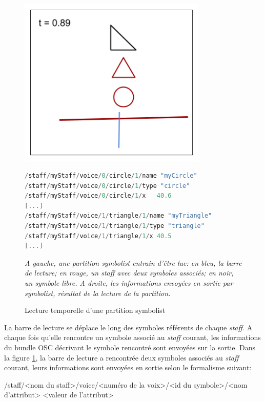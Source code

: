 \begin{figure}[H]

\centering
\begin{minipage}{0.45\textwidth}
	\includegraphics[keepaspectratio=true, width=0.8\textwidth]{ModeleDeNotation/i/readingTheScore.png}
\end{minipage}%
\begin{minipage}{0.45\textwidth}
\begin{lstlisting}[language = {C++}, numbers=none]
/staff/myStaff/voice/0/circle/1/name "myCircle"
/staff/myStaff/voice/0/circle/1/type "circle"
/staff/myStaff/voice/0/circle/1/x	40.6
[...]
/staff/myStaff/voice/1/triangle/1/name "myTriangle"
/staff/myStaff/voice/1/triangle/1/type "triangle"
/staff/myStaff/voice/1/triangle/1/x	40.5 
[...]
\end{lstlisting}
\end{minipage}%

\caption{Lecture temporelle d'une partition symbolist}
\label{fig:readingTheScore}
\small
\it
A gauche, une partition \emph{symbolist} entrain d'être lue: en bleu, la barre de lecture; en rouge, un staff avec deux symboles associés; en noir, un symbole libre. A droite, les informations envoyées en sortie par \emph{symbolist}, résultat de la lecture de la partition.
\end{figure}

La barre de lecture se déplace le long des symboles référents de chaque \textit{staff}. A chaque fois qu'elle rencontre un symbole associé au \textit{staff} courant, les informations du bundle OSC décrivant le symbole rencontré sont envoyées sur la sortie. Dans la figure \ref{fig:readingTheScore}, la barre de lecture a rencontrée deux symboles associés au \textit{staff} courant, leurs informations sont envoyées en sortie selon le formalisme suivant:
\begin{center}
\tiny 
/staff/<nom du staff>/voice/<numéro de la voix>/<id du symbole>/<nom d'attribut> <valeur de l'attribut>
\end{center}

